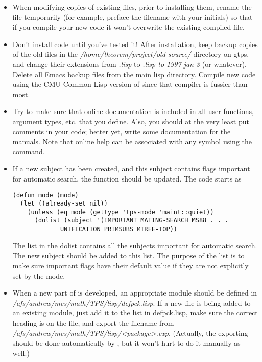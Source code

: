 \begin{itemize}
\item When modifying copies of existing files, prior to installing them, 
rename the file temporarily (for example, preface the filename with your 
initials) so that if you compile your new code it won't overwrite the 
existing compiled file.

\item Don't install code until you've tested it! After installation, keep backup 
copies of the old files
in the {\it /home/theorem/project/old-source/} directory on gtps, and change their
extensions from {\it .lisp} to {\it .lisp-to-1997-jan-3} (or whatever). Delete
all Emacs backup files from the main lisp directory. Compile new code using
the CMU Common Lisp version of \TPS since that compiler is fussier than most.

\item Try to make sure that online documentation is included in all user
functions, argument types, etc. that you define. Also, you should at the very least 
put comments in your code; better yet, write some documentation for the manuals.
Note that online help can be associated with any symbol using the
 command.

\item If a new subject has been created, and this subject contains
flags important for automatic search, the function  
 should be updated.  The code starts as

\begin{verbatim}
(defun mode (mode)
  (let ((already-set nil))
    (unless (eq mode (gettype 'tps-mode 'maint::quiet))
      (dolist (subject '(IMPORTANT MATING-SEARCH MS88 . . .
			 UNIFICATION PRIMSUBS MTREE-TOP))
\end{verbatim}
The list in the dolist contains all the subjects important for automatic search.
The new subject should be added to this list.  The purpose of the list is
to make sure important flags have their default value if they are not explicitly set by the mode.

\item When a new part of \TPS is developed, an appropriate module should be defined in
{\it /afs/andrew/mcs/math/TPS/lisp/defpck.lisp}. If a new file is being added to 
an existing module, just add it to the list in defpck.lisp, make sure the correct
heading is on the file, and export the filename from 
{\it /afs/andrew/mcs/math/TPS/lisp/<package>.exp}. (Actually, the exporting should 
be done automatically by \tps, but it won't hurt to do it manually as well.)


\end{itemize}
